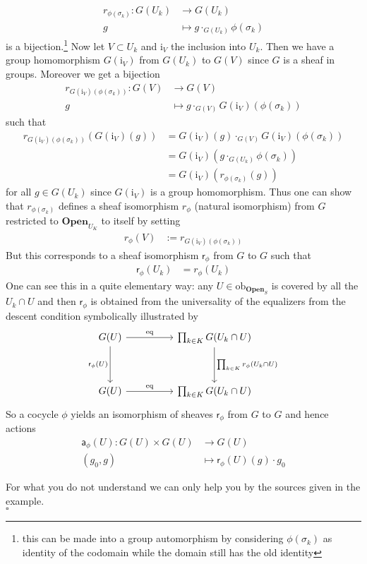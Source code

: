 \begin{exa}
\begin{align*}
  r_{\phi(\sigma_{k})}
  \colon
  G(U_{k})
  &\rightarrow
  G(U_{k})
  \\
  g
  &\mapsto
  g
  \cdot_{G(U_{k})}
  \phi(\sigma_{k})
\end{align*}
is a bijection.\footnote{this can be made into a group automorphism by considering $\phi(\sigma_{k})$ as identity of the codomain while the domain still has the old identity} Now let $V \subset U_{k}$ and $\mathrm{i}_{V}$ the inclusion into $U_{k}$. Then we have a group homomorphism $G(\mathrm{i}_{V})$ from $G(U_{k})$ to $G(V)$ since $G$ is a sheaf in groups. Moreover we get a bijection
\begin{align*}
  r_{G(\mathrm{i}_{V})(\phi(\sigma_{k}))}
  \colon
  G(V)
  &\rightarrow
  G(V)
  \\
  g
  &\mapsto
  g
  \cdot_{G(V)}
  G(\mathrm{i}_{V})
  \left(
    \phi(\sigma_{k})
  \right)
\end{align*}
such that
\begin{align*}
  r_{G(\mathrm{i}_{V})(\phi(\sigma_{k}))}
  \left(
    G(\mathrm{i}_{V})(g)
  \right)
  &=
  G(\mathrm{i}_{V})(g)
  \cdot_{G(V)}
  G(\mathrm{i}_{V})
  \left(
    \phi(\sigma_{k})
  \right)
  \\
  &=
  G(\mathrm{i}_{V})
  \left(
    g
    \cdot_{G(U_{k})}
    \phi(\sigma_{k})
  \right)
  \\
  &=
  G(\mathrm{i}_{V})
  \left(
    r_{\phi(\sigma_{k})}(g)
  \right)
\end{align*}
for all $g \in G(U_{k})$ since $G(\mathrm{i}_{V})$ is a group homomorphism. Thus one can show that $r_{\phi(\sigma_{k})}$ defines a sheaf isomorphism $r_{\phi}$ (natural isomorphism) from $G$ restricted to $\mathbf{Open}_{U_{K}}$ to itself by setting
\begin{align*}
  r_{\phi}(V)
  &:=
  r_{G(\mathrm{i}_{V})(\phi(\sigma_{k}))}
\end{align*}
But this corresponds to a sheaf isomorphism $\mathsf{r}_{\phi}$ from $G$ to $G$ such that
\begin{align*}
  \mathsf{r}_{\phi}(U_{k})
  &=
  r_{\phi}(U_{k})
\end{align*}
One can see this in a quite elementary way: any $U \in \mathrm{ob}_{\mathbf{Open}_{S}}$ is covered by all the $U_{k} \cap U$ and then $\mathsf{r}_{\phi}$ is obtained from the universality of the equalizers from the descent condition symbolically illustrated by
\[
\begin{tikzcd}[sep=huge]
  G(U)
  \arrow{r}{\mathrm{eq}}
  \arrow[swap]{d}{\mathsf{r}_{\phi}(U)}
  &
  \prod_{k \in K}
  G(U_{k} \cap U)
  \arrow{d}{\prod_{k \in K}r_{\phi}(U_{k} \cap U)}
  \\
  G(U)
  \arrow{r}{\mathrm{eq}}
  &
  \prod_{k \in K}
  G(U_{k} \cap U)
\end{tikzcd}
\]
So a cocycle $\phi$ yields an isomorphism of sheaves $\mathsf{r}_{\phi}$ from $G$ to $G$ and hence actions
\begin{align*}
  \mathsf{a}_{\phi}(U)
  \colon
  G(U)
  \times
  G(U)
  &\rightarrow
  G(U)
  \\
  (g_{0},g)
  &\mapsto
  \mathsf{r}_{\phi}(U)(g)
  \cdot
  g_{0}
\end{align*}
\fi
\end{exa}
\begin{prf}
For what you do not understand we can only help you by the sources given in the example.
\\
\phantom{proven}
\hfill
$\square$
\end{prf}
